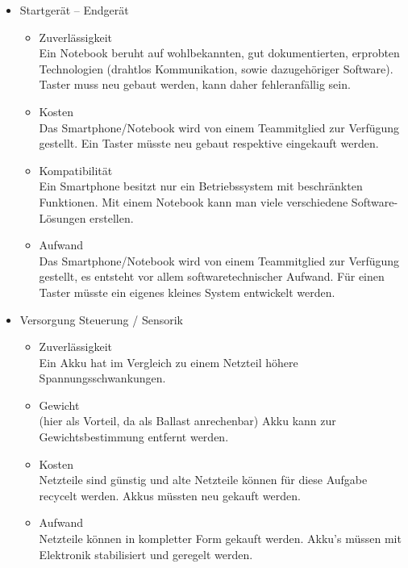 \begin{itemize}
			\item Startgerät – Endgerät
				\begin{itemize}
					\item Zuverlässigkeit\\
					Ein Notebook beruht auf wohlbekannten, gut dokumentierten, erprobten Technologien (drahtlos Kommunikation, sowie dazugehöriger Software). Taster muss neu gebaut werden, kann daher fehleranfällig sein.
					\item Kosten\\
					Das Smartphone/Notebook wird von einem Teammitglied zur Verfügung gestellt. Ein Taster müsste neu gebaut respektive eingekauft werden.
					\item Kompatibilität\\
					Ein Smartphone besitzt nur ein Betriebssystem mit beschränkten Funktionen. Mit einem Notebook kann man viele verschiedene Software-Lösungen erstellen.
					\item Aufwand\\
					Das Smartphone/Notebook wird von einem Teammitglied zur Verfügung gestellt, es entsteht vor allem softwaretechnischer Aufwand. Für einen Taster müsste ein eigenes kleines System entwickelt werden.
				\end{itemize}
				
			\item Versorgung Steuerung / Sensorik
				\begin{itemize}
					\item Zuverlässigkeit\\
					Ein Akku hat im Vergleich zu einem Netzteil höhere Spannungsschwankungen.
					\item Gewicht\\
					(hier als Vorteil, da als Ballast anrechenbar) Akku kann zur Gewichtsbestimmung entfernt werden.
					\item Kosten\\
					Netzteile sind günstig und alte Netzteile können für diese Aufgabe recycelt werden. Akkus müssten neu gekauft werden.
					\item Aufwand\\
					Netzteile können in kompletter Form gekauft werden. Akku’s müssen mit Elektronik stabilisiert und geregelt werden.
				\end{itemize}
				

\end{itemize}
